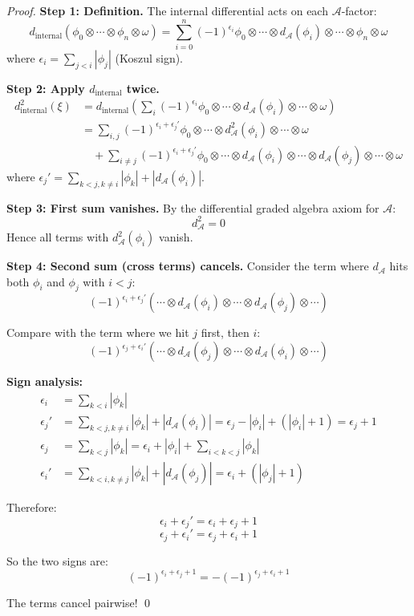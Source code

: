 \begin{proof}
\textbf{Step 1: Definition.}
The internal differential acts on each $\mathcal{A}$-factor:
$$d_{\text{internal}}(\phi_0 \otimes \cdots \otimes \phi_n \otimes \omega) 
= \sum_{i=0}^n (-1)^{\epsilon_i} \phi_0 \otimes \cdots \otimes d_{\mathcal{A}}(\phi_i) 
\otimes \cdots \otimes \phi_n \otimes \omega$$
where $\epsilon_i = \sum_{j<i} |\phi_j|$ (Koszul sign).

\textbf{Step 2: Apply $d_{\text{internal}}$ twice.}
\begin{align*}
d_{\text{internal}}^2(\xi) &= d_{\text{internal}}\left(\sum_i (-1)^{\epsilon_i} 
\phi_0 \otimes \cdots \otimes d_{\mathcal{A}}(\phi_i) \otimes \cdots \otimes \omega\right)\\
&= \sum_{i,j} (-1)^{\epsilon_i + \epsilon_j'} \phi_0 \otimes \cdots \otimes 
d_{\mathcal{A}}^2(\phi_i) \otimes \cdots \otimes \omega \\
&\quad + \sum_{i \neq j} (-1)^{\epsilon_i + \epsilon_j'} \phi_0 \otimes \cdots \otimes 
d_{\mathcal{A}}(\phi_i) \otimes \cdots \otimes d_{\mathcal{A}}(\phi_j) \otimes \cdots \otimes \omega
\end{align*}
where $\epsilon_j' = \sum_{k<j, k \neq i} |\phi_k| + |d_{\mathcal{A}}(\phi_i)|$.

\textbf{Step 3: First sum vanishes.}
By the differential graded algebra axiom for $\mathcal{A}$:
$$d_{\mathcal{A}}^2 = 0$$
Hence all terms with $d_{\mathcal{A}}^2(\phi_i)$ vanish.

\textbf{Step 4: Second sum (cross terms) cancels.}
Consider the term where $d_{\mathcal{A}}$ hits both $\phi_i$ and $\phi_j$ with $i < j$:
$$(-1)^{\epsilon_i + \epsilon_j'} (\cdots \otimes d_{\mathcal{A}}(\phi_i) \otimes 
\cdots \otimes d_{\mathcal{A}}(\phi_j) \otimes \cdots)$$

Compare with the term where we hit $j$ first, then $i$:
$$(-1)^{\epsilon_j + \epsilon_i'} (\cdots \otimes d_{\mathcal{A}}(\phi_j) \otimes 
\cdots \otimes d_{\mathcal{A}}(\phi_i) \otimes \cdots)$$

\textbf{Sign analysis:}
\begin{align*}
\epsilon_i &= \sum_{k<i} |\phi_k|\\
\epsilon_j' &= \sum_{k<j, k \neq i} |\phi_k| + |d_{\mathcal{A}}(\phi_i)|
= \epsilon_j - |\phi_i| + (|\phi_i| + 1) = \epsilon_j + 1\\
\epsilon_j &= \sum_{k<j} |\phi_k| = \epsilon_i + |\phi_i| + \sum_{i < k < j} |\phi_k|\\
\epsilon_i' &= \sum_{k<i, k \neq j} |\phi_k| + |d_{\mathcal{A}}(\phi_j)|
= \epsilon_i + (|\phi_j| + 1)
\end{align*}

Therefore:
$$\epsilon_i + \epsilon_j' = \epsilon_i + \epsilon_j + 1$$
$$\epsilon_j + \epsilon_i' = \epsilon_j + \epsilon_i + 1$$

So the two signs are:
$$(-1)^{\epsilon_i + \epsilon_j + 1} = -(-1)^{\epsilon_j + \epsilon_i + 1}$$

The terms cancel pairwise! \qed
\end{proof}

